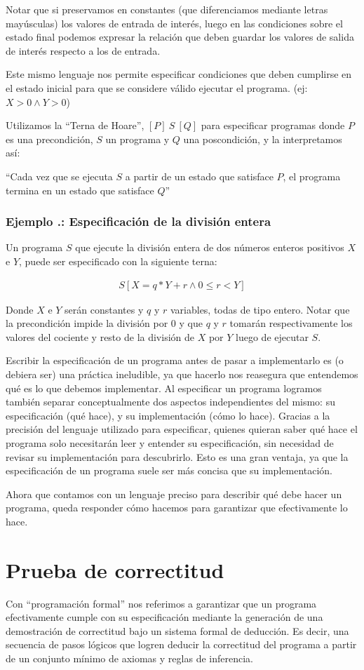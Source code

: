 \documentclass[12pt, a4paper, openany, fleqn]{book}
\newcounter{example}[chapter]
\renewcommand{\theexample}{\thechapter.\arabic{example}}
\newcommand{\example}[1]{
  \refstepcounter{example} %
  \subsubsection*{Ejemplo \theexample: #1}
}
\newcommand{\hoare}[3]{\ensuremath{[#1]\ #2\ [#3]}}
\newcommand{\verticalHoare}[3]{
    \begin{align*}
        [#1]
        #2
        [#3]
    \end{align*}
}
\begin{document}
    Notar que si preservamos en constantes (que diferenciamos mediante letras mayúsculas) los valores de entrada de interés, luego en las condiciones sobre el estado final podemos expresar la relación que deben guardar los valores de salida de interés respecto a los de entrada.

    Este mismo lenguaje nos permite especificar condiciones que deben cumplirse en el estado inicial para que se considere válido ejecutar el programa. (ej: $X > 0 \land Y > 0$)

    Utilizamos la ``Terna de Hoare'', \hoare{P}{S}{Q} para especificar programas donde $P$ es una precondición, $S$ un programa y $Q$ una poscondición, y la interpretamos así:

    ``Cada vez que se ejecuta $S$ a partir de un estado que satisface $P$, el programa termina en un estado que satisface $Q$''

    \example{Especificación de la división entera}

    Un programa $S$ que ejecute la división entera de dos números enteros positivos $X$ e $Y$, puede ser especificado con la siguiente terna:
    \verticalHoare{X > 0 \land Y > 0}{S}{X = q * Y + r \land 0 \leqslant r < Y}
    Donde $X$ e $Y$ serán constantes y $q$ y $r$ variables, todas de tipo entero.
    Notar que la precondición impide la división por $0$ y que $q$ y $r$ tomarán respectivamente los valores del cociente y resto de la división de $X$ por $Y$ luego de ejecutar $S$.

    Escribir la especificación de un programa antes de pasar a implementarlo es (o debiera ser) una práctica ineludible, ya que hacerlo nos reasegura que entendemos qué es lo que debemos implementar.
    Al especificar un programa logramos también separar conceptualmente dos aspectos independientes del mismo: su especificación (qué hace), y su implementación (cómo lo hace).
    Gracias a la precisión del lenguaje utilizado para especificar, quienes quieran saber qué hace el programa solo necesitarán leer y entender su especificación, sin necesidad de revisar su implementación para descubrirlo. Esto es una gran ventaja, ya que la especificación de un programa suele ser más concisa que su implementación.

    Ahora que contamos con un lenguaje preciso para describir qué debe hacer un programa, queda responder cómo hacemos para garantizar que efectivamente lo hace.

    \section{Prueba de correctitud}
    Con ``programación formal'' nos referimos a garantizar que un programa efectivamente cumple con su especificación mediante la generación de una demostración de correctitud bajo un sistema formal de deducción. Es decir, una secuencia de pasos lógicos que logren deducir la correctitud del programa a partir de un conjunto mínimo de axiomas y reglas de inferencia.
\end{document}
